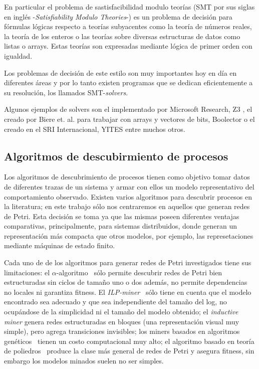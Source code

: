 \documentclass{llncs}
\begin{document}
En particular el problema de sastisfacibilidad modulo teorías (SMT por sus siglas en inglés -\textit{Satisfiability Modulo Theories}-) es un problema de decisión para fórmulas lógicas respecto a teorías subyacentes como la teoría de números reales, la teoría de los enteros o las teorías sobre diversas estructuras de datos como listas o arrays. Estas teorías son expresadas mediante lógica de primer orden con igualdad.

Los problemas de decisión de este estilo son muy importantes hoy en día en diferentes áreas y por lo tanto existen programas que se dedican eficientemente a su resolución, los llamados SMT-\textit{solvers}\cite{BjornerDeMoura2009}. 

Algunos ejemplos de solvers son el implementado por Microsoft Research, Z3 \cite{MouraB08}, el creado por Biere et. al. para trabajar con arrays y vectores de bits, Boolector \cite{Brummayer09} o el creado en el SRI Internacional, YITES \cite{dutertre2006yices} entre muchos otros.

\subsection{Algoritmos de descubirmiento de procesos}

Los algoritmos de descubrimiento de procesos tienen como objetivo tomar datos de diferentes trazas de un sistema y armar con ellos un modelo representativo del comportamiento observado. Existen varios algoritmos para descubrir procesos en la literatura; en este trabajo sólo nos centraremos en aquellos que generan redes de Petri. Esta decisión se toma ya que las mismas poseen diferentes ventajas comparativas, principalmente, para sistemas distribuidos, donde generan un representación más compacta que otros modelos, por ejemplo, las represetaciones mediante máquinas de estado finito.

Cada uno de de los algoritmos para generar redes de Petri investigados tiene sus limitaciones: el $\alpha$-algoritmo~\cite{AalstWM04} sólo permite descubrir redes de Petri bien estructuradas sin ciclos de tama\~no uno o dos además, no permite dependencias no locales ni garantiza fitness. El \textit{ILP-miner}~\cite{derWerfDHS09} sólo tiene en cuenta que el modelo encontrado sea adecuado y que sea independiente del tama\~no del log, no ocupándose de la simplicidad ni el tama\~no del modelo obtenido; el \textit{inductive miner}\cite{LeemansFV14} genera redes estructuradas en bloques (una representación visual muy simple), pero agrega transiciones invisibles; los miners basados en algoritmos genéticos~\cite{MedeirosWA07} tienen un costo computacional muy alto; el algoritmo basado en teoría de poliedros~\cite{CarmonaC14} produce la clase más general de redes de Petri y asegura fitness, sin embargo los modelos minados suelen no ser simples.
\end{document}
